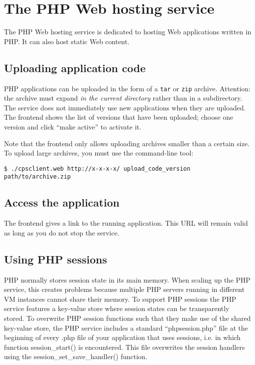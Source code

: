 \documentclass[10pt]{article}
\begin{document}
\section{The PHP Web hosting service}

The PHP Web hosting service is dedicated to hosting Web applications
written in PHP. It can also host static Web content.

\subsection{Uploading application code}

PHP applications can be uploaded in the form of a \texttt{tar} or
\texttt{zip} archive.  Attention: the archive must expand \emph{in the
  current directory} rather than in a subdirectory. The service does
not immediately use new applications when they are uploaded. The
frontend shows the list of versions that have been uploaded; choose
one version and click ``make active'' to activate it.

Note that the frontend only allows uploading archives smaller than a
certain size.  To upload large archives, you must use the command-line
tool:
\begin{verbatim}
$ ./cpsclient.web http://x-x-x-x/ upload_code_version path/to/archive.zip
\end{verbatim}

\subsection{Access the application}

The frontend gives a link to the running application. This URL will
remain valid as long as you do not stop the service.

\subsection{Using PHP sessions}

PHP normally stores session state in its main memory. When scaling up
the PHP service, this creates problems because multiple PHP servers
running in different VM instances cannot share their memory. To
support PHP sessions the PHP service features a key-value store where
session states can be transparently stored. To overwrite PHP session
functions such that they make use of the shared key-value store, the
PHP service includes a standard ``phpsession.php'' file at the
beginning of every .php file of your application that uses sessions,
i.e. in which function session\_start() is encountered.  This file
overwrites the session handlers using the
session\_set\_save\_handler() function.
\end{document}
